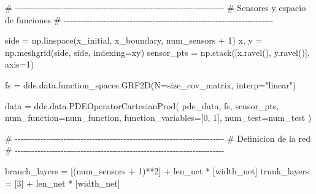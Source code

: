 \documentclass[
  spanish,
  us-letterpaper,
]{scrreprt}
\newenvironment{Shaded}{\begin{snugshade}}{\end{snugshade}}
\newcommand{\CommentTok}[1]{\textcolor[rgb]{0.37,0.37,0.37}{#1}}
\newcommand{\DecValTok}[1]{\textcolor[rgb]{0.68,0.00,0.00}{#1}}
\newcommand{\NormalTok}[1]{\textcolor[rgb]{0.00,0.23,0.31}{#1}}
\newcommand{\OperatorTok}[1]{\textcolor[rgb]{0.37,0.37,0.37}{#1}}
\newcommand{\StringTok}[1]{\textcolor[rgb]{0.13,0.47,0.30}{#1}}
\theoremstyle{definition}
\theoremstyle{plain}
\theoremstyle{remark}
\begin{document}
\begin{Shaded}
\begin{Highlighting}[]
\CommentTok{\# {-}{-}{-}{-}{-}{-}{-}{-}{-}{-}{-}{-}{-}{-}{-}{-}{-}{-}{-}{-}{-}{-}{-}{-}{-}{-}{-}{-}{-}{-}{-}{-}{-}{-}{-}{-}{-}{-}{-}{-}{-}{-}{-}{-}{-}{-}{-}{-}{-}{-}{-}{-}{-}{-}{-}{-}{-}{-}{-}{-}{-}{-}{-}{-}{-}{-}{-}{-}{-}{-}{-}{-}{-}}
\CommentTok{\# Sensores y espacio de funciones}
\CommentTok{\# {-}{-}{-}{-}{-}{-}{-}{-}{-}{-}{-}{-}{-}{-}{-}{-}{-}{-}{-}{-}{-}{-}{-}{-}{-}{-}{-}{-}{-}{-}{-}{-}{-}{-}{-}{-}{-}{-}{-}{-}{-}{-}{-}{-}{-}{-}{-}{-}{-}{-}{-}{-}{-}{-}{-}{-}{-}{-}{-}{-}{-}{-}{-}{-}{-}{-}{-}{-}{-}{-}{-}{-}{-}}

\NormalTok{side }\OperatorTok{=}\NormalTok{ np.linspace(x\_initial, x\_boundary, num\_sensors }\OperatorTok{+} \DecValTok{1}\NormalTok{)}
\NormalTok{x, y }\OperatorTok{=}\NormalTok{ np.meshgrid(side, side, indexing}\OperatorTok{=}\StringTok{\textquotesingle{}xy\textquotesingle{}}\NormalTok{)}
\NormalTok{sensor\_pts }\OperatorTok{=}\NormalTok{ np.stack([x.ravel(), y.ravel()], axis}\OperatorTok{=}\DecValTok{1}\NormalTok{)}

\NormalTok{fs }\OperatorTok{=}\NormalTok{ dde.data.function\_spaces.GRF2D(N}\OperatorTok{=}\NormalTok{size\_cov\_matrix, }
\NormalTok{                                    interp}\OperatorTok{=}\StringTok{"linear"}\NormalTok{)}

\NormalTok{data }\OperatorTok{=}\NormalTok{ dde.data.PDEOperatorCartesianProd(}
\NormalTok{    pde\_data,}
\NormalTok{    fs,}
\NormalTok{    sensor\_pts,}
\NormalTok{    num\_function}\OperatorTok{=}\NormalTok{num\_function,}
\NormalTok{    function\_variables}\OperatorTok{=}\NormalTok{[}\DecValTok{0}\NormalTok{, }\DecValTok{1}\NormalTok{],}
\NormalTok{    num\_test}\OperatorTok{=}\NormalTok{num\_test}
\NormalTok{)}

\CommentTok{\# {-}{-}{-}{-}{-}{-}{-}{-}{-}{-}{-}{-}{-}{-}{-}{-}{-}{-}{-}{-}{-}{-}{-}{-}{-}{-}{-}{-}{-}{-}{-}{-}{-}{-}{-}{-}{-}{-}{-}{-}{-}{-}{-}{-}{-}{-}{-}{-}{-}{-}{-}{-}{-}{-}{-}{-}{-}{-}{-}{-}{-}{-}{-}{-}{-}{-}{-}{-}{-}{-}{-}{-}{-}}
\CommentTok{\# Definicion de la red}
\CommentTok{\# {-}{-}{-}{-}{-}{-}{-}{-}{-}{-}{-}{-}{-}{-}{-}{-}{-}{-}{-}{-}{-}{-}{-}{-}{-}{-}{-}{-}{-}{-}{-}{-}{-}{-}{-}{-}{-}{-}{-}{-}{-}{-}{-}{-}{-}{-}{-}{-}{-}{-}{-}{-}{-}{-}{-}{-}{-}{-}{-}{-}{-}{-}{-}{-}{-}{-}{-}{-}{-}{-}{-}{-}{-}}

\NormalTok{branch\_layers }\OperatorTok{=}\NormalTok{ [(num\_sensors }\OperatorTok{+} \DecValTok{1}\NormalTok{)}\OperatorTok{**}\DecValTok{2}\NormalTok{] }\OperatorTok{+}\NormalTok{ len\_net }\OperatorTok{*}\NormalTok{ [width\_net]}
\NormalTok{trunk\_layers }\OperatorTok{=}\NormalTok{ [}\DecValTok{3}\NormalTok{] }\OperatorTok{+}\NormalTok{ len\_net }\OperatorTok{*}\NormalTok{ [width\_net]}


\end{Highlighting}
\end{Shaded}
\end{document}
